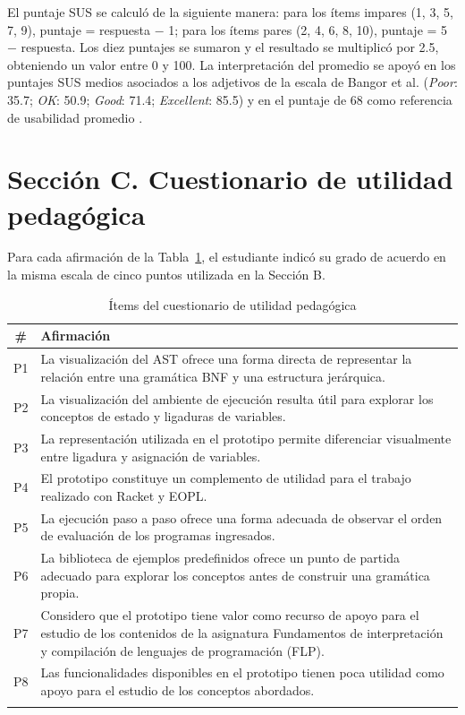 El puntaje SUS se calculó de la siguiente manera: para los ítems impares (1, 3, 5, 7, 9), puntaje = respuesta $-$ 1; para los ítems pares (2, 4, 6, 8, 10), puntaje = 5 $-$ respuesta. Los diez puntajes se sumaron y el resultado se multiplicó por 2.5, obteniendo un valor entre 0 y 100. La interpretación del promedio se apoyó en los puntajes SUS medios asociados a los adjetivos de la escala de Bangor et al. (\textit{Poor}: 35.7; \textit{OK}: 50.9; \textit{Good}: 71.4; \textit{Excellent}: 85.5) \cite{bangor2009determining} y en el puntaje de 68 como referencia de usabilidad promedio \cite{sauro2016quantifying}.

\section{Sección C. Cuestionario de utilidad pedagógica}

Para cada afirmación de la Tabla~\ref{tab:pedagogica-items}, el estudiante indicó su grado de acuerdo en la misma escala de cinco puntos utilizada en la Sección B.

\begin{longtable}{|c|p{12cm}|}
\hline
\textbf{\#} & \textbf{Afirmación} \\
\hline
P1 & La visualización del AST ofrece una forma directa de representar la relación entre una gramática BNF y una estructura jerárquica. \\
\hline
P2 & La visualización del ambiente de ejecución resulta útil para explorar los conceptos de estado y ligaduras de variables. \\
\hline
P3 & La representación utilizada en el prototipo permite diferenciar visualmente entre ligadura y asignación de variables. \\
\hline
P4 & El prototipo constituye un complemento de utilidad para el trabajo realizado con Racket y EOPL. \\
\hline
P5 & La ejecución paso a paso ofrece una forma adecuada de observar el orden de evaluación de los programas ingresados. \\
\hline
P6 & La biblioteca de ejemplos predefinidos ofrece un punto de partida adecuado para explorar los conceptos antes de construir una gramática propia. \\
\hline
P7 & Considero que el prototipo tiene valor como recurso de apoyo para el estudio de los contenidos de la asignatura Fundamentos de interpretación y compilación de lenguajes de programación (FLP). \\
\hline
P8 & Las funcionalidades disponibles en el prototipo tienen poca utilidad como apoyo para el estudio de los conceptos abordados. \\
\hline
\caption{Ítems del cuestionario de utilidad pedagógica}
\label{tab:pedagogica-items}
\end{longtable}

